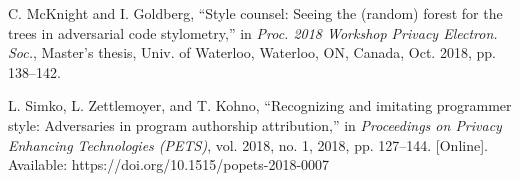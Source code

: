 \documentclass[conference]{IEEEtran}
\begin{document}
\begin{thebibliography}{00}
    C. McKnight and I. Goldberg, ``Style counsel: Seeing the (random) forest for the trees in adversarial code stylometry,'' in \textit{Proc. 2018 Workshop Privacy Electron. Soc.}, Master's thesis, Univ. of Waterloo, Waterloo, ON, Canada, Oct. 2018, pp. 138--142.

L. Simko, L. Zettlemoyer, and T. Kohno, ``Recognizing and imitating programmer style: Adversaries in program authorship attribution,'' in \textit{Proceedings on Privacy Enhancing Technologies (PETS)}, vol. 2018, no. 1, 2018, pp. 127--144. [Online]. Available: https://doi.org/10.1515/popets-2018-0007


\end{thebibliography}
    
\end{document}
